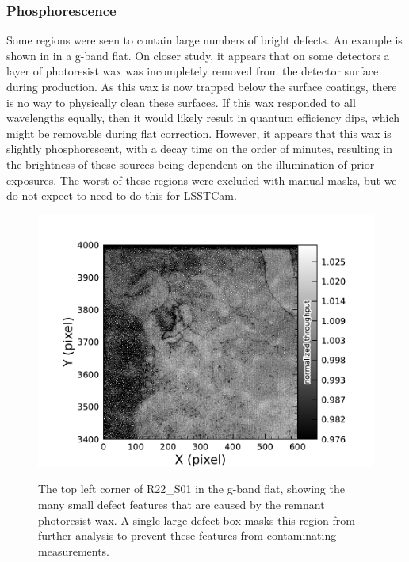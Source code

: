 \subsubsection{Phosphorescence}
Some regions were seen to contain large numbers of bright defects.
An example is shown in    in a g-band flat. 
On closer study, it appears that on some detectors a layer of photoresist wax was incompletely removed from the detector surface during production.
As this wax is now trapped below the surface coatings, there is no way to physically clean these surfaces.
If this wax responded to all wavelengths equally, then it would likely result in quantum efficiency dips, which might be removable during flat correction.
However, it appears that this wax is slightly phosphorescent, with a decay time on the order of minutes, resulting in the brightness of these sources being dependent on the illumination of prior exposures.
The worst of these regions were excluded with manual masks, but we do not expect to need to do this for LSSTCam.
\begin{figure}[htb!]
  \centering
  \includegraphics[width=0.98\linewidth]{figures/dp1_isr_anomalies-phosphorescence.pdf}
  \label{fig:anomalies_phosphorescence}
  \caption{
    The top left corner of R22\_S01 in the g-band flat, showing the many small defect features that are caused by the remnant photoresist wax.
    A single large defect box masks this region from further analysis to prevent these features from contaminating measurements.
  }
\end{figure}

